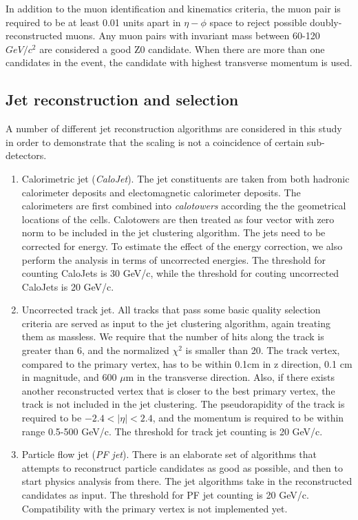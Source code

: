 \documentclass{cmspaper}
\begin{document}
In addition to the muon identification and kinematics criteria, the muon pair is required to be at least 0.01 units apart in $\eta-\phi$ space
to reject possible doubly-reconstructed muons.
Any muon pairs with invariant mass between 60-120 $GeV/c^2$ are considered a good Z0 candidate.
When there are more than one candidates in the event, the candidate with highest transverse momentum is used.

\subsection{Jet reconstruction and selection}

A number of different jet reconstruction algorithms are considered in this study in order to demonstrate that the scaling is not a coincidence of certain sub-detectors.

\begin{enumerate}
\item Calorimetric jet (\emph{CaloJet}).  The jet constituents are taken from both hadronic calorimeter deposits and electomagnetic calorimeter deposits.
   The calorimeters are first combined into \emph{calotowers} according the the geometrical locations of the cells.
   Calotowers are then treated as four vector with zero norm to be included in the jet clustering algorithm.
   The jets need to be corrected for energy.  To estimate the effect of the energy correction, we also perform the analysis in terms of uncorrected energies.
   The threshold for counting CaloJets is 30 GeV/c, while the threshold for couting uncorrected CaloJets is 20 GeV/c.
\item Uncorrected track jet.  All tracks that pass some basic quality selection criteria are served as input to the jet clustering algorithm, again treating them as massless.
   We require that the number of hits along the track is greater than 6, and the normalized $\chi^2$ is smaller than 20.
   The track vertex, compared to the primary vertex, has to be within 0.1cm in z direction, 0.1 cm in magnitude, and 600 $\mu$m in the transverse direction.
   Also, if there exists another reconstructed vertex that is closer to the best primary vertex, the track is not included in the jet clustering.
   The pseudorapidity of the track is required to be $-2.4 < |\eta| < 2.4$, and the momentum is required to be within range 0.5-500 GeV/c.
   The threshold for track jet counting is 20 GeV/c.
\item Particle flow jet (\emph{PF jet}).  There is an elaborate set of algorithms that attempts to reconstruct particle candidates as good as possible,
   and then to start physics analysis from there.  The jet algorithms take in the reconstructed candidates as input.
   The threshold for PF jet counting is 20 GeV/c.  Compatibility with the primary vertex is not implemented yet.
\end{enumerate}
\end{document}
